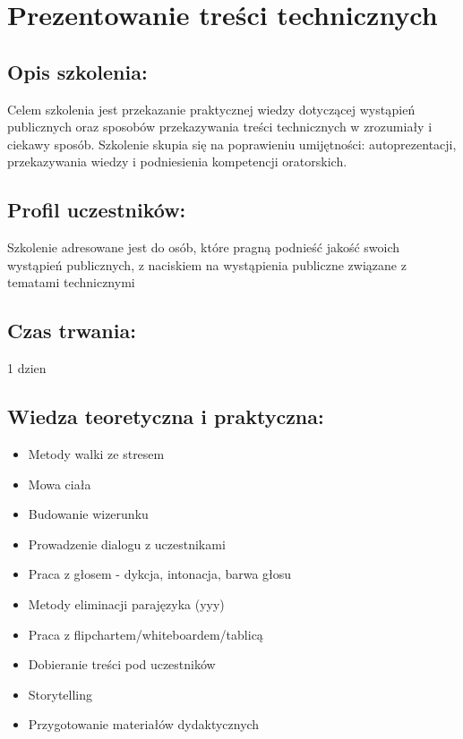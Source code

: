 \documentclass{article}[10pt]
\begin{document}
    
	\section{Prezentowanie treści technicznych}

	\subsection*{Opis szkolenia:}
	\begin{adjustwidth}{2cm}{}
\justifying
		Celem szkolenia jest przekazanie praktycznej wiedzy dotyczącej wystąpień publicznych oraz sposobów przekazywania treści technicznych w zrozumiały i ciekawy sposób. Szkolenie skupia się na poprawieniu umijętności: autoprezentacji, przekazywania wiedzy i podniesienia kompetencji oratorskich.

	\end{adjustwidth}
	\subsection*{Profil uczestników:}
\begin{adjustwidth}{2cm}{}
\justifying
	Szkolenie adresowane jest do osób, które pragną podnieść jakość swoich wystąpień publicznych, z naciskiem na wystąpienia publiczne związane z tematami technicznymi
\end{adjustwidth}
	\subsection*{Czas trwania:}
\begin{adjustwidth}{2cm}{}
	1 dzien
\end{adjustwidth}

	\subsection*{Wiedza teoretyczna i praktyczna:}
\begin{adjustwidth}{1.5cm}{}
	\begin{itemize}
		\item Metody walki ze stresem
		\item Mowa ciała
		\item Budowanie wizerunku
		\item Prowadzenie dialogu z uczestnikami
		\item Praca z głosem - dykcja, intonacja, barwa głosu
		\item Metody eliminacji parajęzyka (yyy)
		\item Praca z flipchartem/whiteboardem/tablicą
		\item Dobieranie treści pod uczestników
		\item Storytelling
		\item Przygotowanie materiałów dydaktycznych
	\end{itemize}
\end{adjustwidth}
\end{document}
